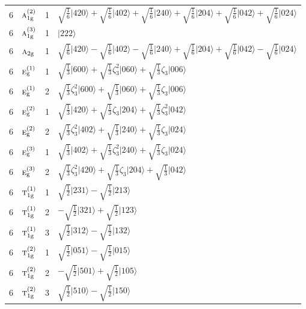 \documentclass[11pt]{article}
\newcommand{\irr}[1]{\text{\normalfont\scshape #1}}
\newcommand{\ptag}[1]{\mathrm{#1}}
\newcommand{\rootunity}[1]{\zeta_{#1}}
\newcommand{\occ}[1]{\lvert #1\rangle}
\begin{document}
\begin{longtable}{c l c p{}}
6 & $\irr{a}_{1\ptag{g}}^{(2)}$ & 1 & $\sqrt{\tfrac{1}{6}}\occ{420}+\sqrt{\tfrac{1}{6}}\occ{402}+\sqrt{\tfrac{1}{6}}\occ{240}+\sqrt{\tfrac{1}{6}}\occ{204}+\sqrt{\tfrac{1}{6}}\occ{042}+\sqrt{\tfrac{1}{6}}\occ{024}$\\
6 & $\irr{a}_{1\ptag{g}}^{(3)}$ & 1 & $\occ{222}$\\
6 & $\irr{a}_{2\ptag{g}}$ & 1 & $\sqrt{\tfrac{1}{6}}\occ{420}-\sqrt{\tfrac{1}{6}}\occ{402}-\sqrt{\tfrac{1}{6}}\occ{240}+\sqrt{\tfrac{1}{6}}\occ{204}+\sqrt{\tfrac{1}{6}}\occ{042}-\sqrt{\tfrac{1}{6}}\occ{024}$\\
6 & $\irr{e}_{\ptag{g}}^{(1)}$ & 1 & $\sqrt{\tfrac{1}{3}}\occ{600}+\sqrt{\tfrac{1}{3}}\rootunity{3}^{2}\occ{060}+\sqrt{\tfrac{1}{3}}\rootunity{3}\occ{006}$\\
6 & $\irr{e}_{\ptag{g}}^{(1)}$ & 2 & $\sqrt{\tfrac{1}{3}}\rootunity{3}^{2}\occ{600}+\sqrt{\tfrac{1}{3}}\occ{060}+\sqrt{\tfrac{1}{3}}\rootunity{3}\occ{006}$\\
6 & $\irr{e}_{\ptag{g}}^{(2)}$ & 1 & $\sqrt{\tfrac{1}{3}}\occ{420}+\sqrt{\tfrac{1}{3}}\rootunity{3}\occ{204}+\sqrt{\tfrac{1}{3}}\rootunity{3}^{2}\occ{042}$\\
6 & $\irr{e}_{\ptag{g}}^{(2)}$ & 2 & $\sqrt{\tfrac{1}{3}}\rootunity{3}^{2}\occ{402}+\sqrt{\tfrac{1}{3}}\occ{240}+\sqrt{\tfrac{1}{3}}\rootunity{3}\occ{024}$\\
6 & $\irr{e}_{\ptag{g}}^{(3)}$ & 1 & $\sqrt{\tfrac{1}{3}}\occ{402}+\sqrt{\tfrac{1}{3}}\rootunity{3}^{2}\occ{240}+\sqrt{\tfrac{1}{3}}\rootunity{3}\occ{024}$\\
6 & $\irr{e}_{\ptag{g}}^{(3)}$ & 2 & $\sqrt{\tfrac{1}{3}}\rootunity{3}^{2}\occ{420}+\sqrt{\tfrac{1}{3}}\rootunity{3}\occ{204}+\sqrt{\tfrac{1}{3}}\occ{042}$\\
6 & $\irr{t}_{1\ptag{g}}^{(1)}$ & 1 & $\sqrt{\tfrac{1}{2}}\occ{231}-\sqrt{\tfrac{1}{2}}\occ{213}$\\
6 & $\irr{t}_{1\ptag{g}}^{(1)}$ & 2 & $-\sqrt{\tfrac{1}{2}}\occ{321}+\sqrt{\tfrac{1}{2}}\occ{123}$\\
6 & $\irr{t}_{1\ptag{g}}^{(1)}$ & 3 & $\sqrt{\tfrac{1}{2}}\occ{312}-\sqrt{\tfrac{1}{2}}\occ{132}$\\
6 & $\irr{t}_{1\ptag{g}}^{(2)}$ & 1 & $\sqrt{\tfrac{1}{2}}\occ{051}-\sqrt{\tfrac{1}{2}}\occ{015}$\\
6 & $\irr{t}_{1\ptag{g}}^{(2)}$ & 2 & $-\sqrt{\tfrac{1}{2}}\occ{501}+\sqrt{\tfrac{1}{2}}\occ{105}$\\
6 & $\irr{t}_{1\ptag{g}}^{(2)}$ & 3 & $\sqrt{\tfrac{1}{2}}\occ{510}-\sqrt{\tfrac{1}{2}}\occ{150}$\\

\end{longtable}
\end{document}
